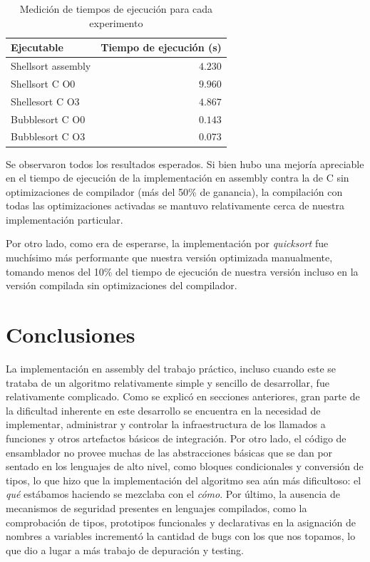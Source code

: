 \documentclass[a4paper,11pt]{article}
\begin{document}
\begin{table}[h!t]
\centering
\begin{tabular}{ | l | r | }
  \hline
  Ejecutable          & Tiempo de ejecución (s) \\ \hline
  Shellsort assembly & \(4.230\) \\
  Shellsort C O0     & \(9.960\) \\
  Shellesort C O3     & \(4.867\) \\
  Bubblesort C O0      & \(0.143\) \\
  Bubblesort C O3      & \(0.073\) \\
  \hline
\end{tabular}
\caption{Medición de tiempos de ejecución para cada experimento}
\label{tab:resultados}
\end{table}

\FloatBarrier

Se observaron todos los resultados esperados. Si bien hubo una mejoría
apreciable en el tiempo de ejecución de la implementación en assembly contra la
de C sin optimizaciones de compilador (más del 50\% de ganancia), la
compilación con todas las optimizaciones activadas se mantuvo relativamente
cerca de nuestra implementación particular.

Por otro lado, como era de esperarse, la implementación por \textit{quicksort}
fue muchísimo más performante que nuestra versión optimizada manualmente,
tomando menos del 10\% del tiempo de ejecución de nuestra versión incluso en la
versión compilada sin optimizaciones del compilador.

\section{Conclusiones}

La implementación en assembly del trabajo práctico, incluso cuando este se
trataba de un algoritmo relativamente simple y sencillo de desarrollar, fue
relativamente complicado. Como se explicó en secciones anteriores, gran parte
de la dificultad inherente en este desarrollo se encuentra en la necesidad de
implementar, administrar y controlar la infraestructura de los llamados a
funciones y otros artefactos básicos de integración. Por otro lado, el código
de ensamblador no provee muchas de las abstracciones básicas que se dan por
sentado en los lenguajes de alto nivel, como bloques condicionales y conversión
de tipos, lo que hizo que la implementación del algoritmo sea aún más
dificultoso: el \textit{qué} estábamos haciendo se mezclaba con el
\textit{cómo}. Por último, la ausencia de mecanismos de seguridad presentes en
lenguajes compilados, como la comprobación de tipos, prototipos funcionales y
declarativas en la asignación de nombres a variables incrementó la cantidad
de bugs con los que nos topamos, lo que dio a lugar a más trabajo de depuración
y testing.
\end{document}
